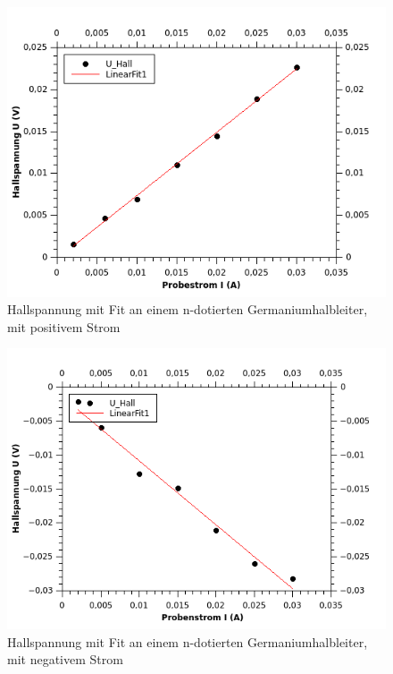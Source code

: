 \documentclass[12pt,a4paper]{article}
\begin{document}
\begin{figure}[H]
	\centering
	\includegraphics[scale=1.20]{./figures/Hall_nGe_+I_UH.png}
	\caption{Hallspannung mit Fit an einem n-dotierten Germaniumhalbleiter, mit positivem Strom}
	\label{fig:nGe_pI_UH}
\end{figure}
\begin{multicols}{2}



\end{multicols}
\begin{figure}[H]
	\centering
	\includegraphics[scale=1.20]{./figures/Hall_nGe_-I_UH.png}
	\caption{Hallspannung mit Fit an einem n-dotierten Germaniumhalbleiter, mit negativem Strom}
	\label{fig:nGe_nI_UH}
\end{figure}
\end{document}
